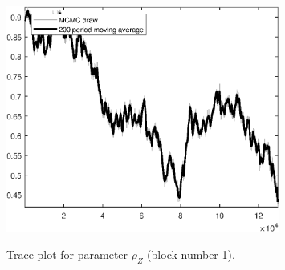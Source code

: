 \begin{figure}[H]
\centering
  \includegraphics[width=0.8\textwidth]{BRS_sectoral_wo_fixed_cost/graphs/TracePlot_rho_Z_blck_1}\\
    \caption{Trace plot for parameter ${\rho_Z}$ (block number 1).}
\end{figure}
